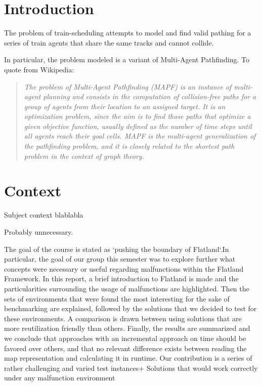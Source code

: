 \section{Introduction}
The problem of train-scheduling attempts to model and find valid pathing for a series of train agents that share the same tracks and cannot collide. 

In particular, the problem modeled is a variant of Multi-Agent Pathfinding. To quote from Wikipedia:
\begin{quote}
\emph{The problem of Multi-Agent Pathfinding (MAPF) is an instance of multi-agent planning and consists in the computation of collision-free paths for a group of agents from their location to an assigned target. It is an optimization problem, since the aim is to find those paths that optimize a given objective function, usually defined as the number of time steps until all agents reach their goal cells. MAPF is the multi-agent generalization of the pathfinding problem, and it is closely related to the shortest path problem in the context of graph theory.}
\end{quote}


\section{Context}

Subject context blablabla

\color{green} Probably unnecessary. \color{black}


The goal of the course is stated as `pushing the boundary of Flatland`.In particular, the goal of our group this semester was to explore further what concepts were necessary or useful regarding malfunctions within the Flatland Framework. In this report, a brief introduction to Flatland is made and the particularities surrounding the usage of malfunctions are highlighted. Then the sets of environments that were found the most interesting for the sake of benchmarking are explained, followed by the solutions that we decided to test for these environments. A comparison is drawn between using solutions that are more reutilization friendly than others. Finally, the results are summarized and  we conclude that approaches with an incremental approach on time should be favored over others, and that no relevant difference exists between reading the map representation and calculating it in runtime.
\color{red}
Our contribution is a series of rather challenging and varied test instances+  
Solutions that would work correctly under any malfunction environment
\color{black}

